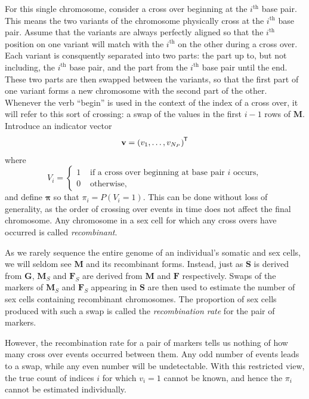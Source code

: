 \documentclass{article}
\newcommand{\ve}[1]{\mathbf{#1}}           %
\newcommand{\sv}[1]{\boldsymbol{#1}}   %
\newcommand{\m}[1]{\mathbf{#1}}               %
\newcommand{\tr}[1]{{#1}^{\mkern-1.5mu\mathsf{T}}}              %
\begin{document}
For this single chromosome, consider a cross over beginning at the $i^{\text{th}}$ base pair. This means the two variants of the chromosome physically cross at the $i^{\text{th}}$ base pair. Assume that the variants are always perfectly aligned so that the $i^{\text{th}}$ position on one variant will match with the $i^{\text{th}}$ on the other during a cross over. Each variant is consquently separated into two parts: the part up to, but not including, the $i^{\text{th}}$ base pair, and the part from the $i^{\text{th}}$ base pair until the end. These two parts are then swapped between the variants, so that the first part of one variant forms a new chromosome with the second part of the other. Whenever the verb ``begin'' is used in the context of the index of a cross over, it will refer to this sort of crossing: a swap of the values in the first $i-1$ rows of $\m{M}$. Introduce an indicator vector
$$\ve{v} = \tr{(v_1, \dots, v_{N_P})}$$
where
\begin{equation} \label{eq:crossindicator}
V_i = \begin{cases}
  1 & \text{ if a cross over beginning at base pair } i \text{ occurs}, \\
  0 & \text{ otherwise},
\end{cases}
\end{equation}
and define $\sv{\pi}$ so that $\pi_i = P(V_i = 1)$. This can be done without loss of generality, as the order of crossing over events in time does not affect the final chromosome. Any chromosome in a sex cell for which any cross overs have occurred is called \textit{recombinant}.

As we rarely sequence the entire genome of an individual's somatic and sex cells, we will seldom see $\m{M}$ and its recombinant forms. Instead, just as $\m{S}$ is derived from $\m{G}$, $\m{M}_S$ and $\m{F}_S$ are derived from $\m{M}$ and $\m{F}$ respectively. Swaps of the markers of $\m{M}_S$ and $\m{F}_S$ appearing in $\m{S}$ are then used to estimate the number of sex cells containing recombinant chromosomes. The proportion of sex cells produced with such a swap is called the \textit{recombination rate} for the pair of markers.

However, the recombination rate for a pair of markers tells us nothing of how many cross over events occurred between them. Any odd number of events leads to a swap, while any even number will be undetectable. With this restricted view, the true count of indices $i$ for which $v_i = 1$ cannot be known, and hence the $\pi_i$ cannot be estimated individually.
\end{document}
